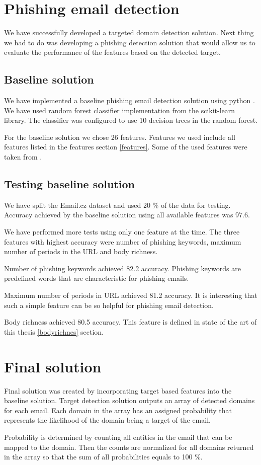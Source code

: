 \documentclass[thesis=B,english]{FITthesis}[2012/10/20]
\begin{document}
\section{Phishing email detection}
We have successfully developed a targeted domain detection solution.
Next thing we had to do was developing a phishing detection solution that would allow us to evaluate the performance of the features based on the detected target. 


\subsection{Baseline solution}
We have implemented a baseline phishing email detection solution using python \cite{python}.
We have used random forest classifier implementation from the scikit-learn library. \cite{pySklearn} The classifier was configured to use 10 decision trees in the random forest.

\par For the baseline solution we chose 26 features. Features we used include all features listed in the features section \ref{features}. Some of the used features were taken from \cite{vitListik2015detekce}. 
 
\subsection{Testing baseline solution}
We have split the Email.cz dataset and used 20 \% of the data for testing. 
Accuracy achieved by the baseline solution using all available features was 97.6.

\par We have performed more tests using only one feature at the time. The three features with highest accuracy were number of phishing keywords, maximum number of periods in the URL and body richness.
\par Number of phishing keywords achieved 82.2 accuracy. Phishing keywords are predefined words that are characteristic for phishing emails.
\par Maximum number of periods in URL achieved 81.2 accuracy. It is interesting that such a simple feature can be so helpful for phishing email detection.
\par Body richness achieved 80.5 accuracy. This feature is defined in state of the art of this thesis \ref{bodyrichnes} section.



\section{Final solution}
Final solution was created by incorporating target based features into the baseline solution.
Target detection solution outputs an array of detected domains for each email.
Each domain in the array has an assigned probability that represents the likelihood of the domain being a target of the email.
\par Probability is determined by counting all entities in the email that can be mapped to the domain. Then the counts are normalized for all domains returned in the array so that the sum of all probabilities equals to 100 \%.
\end{document}
